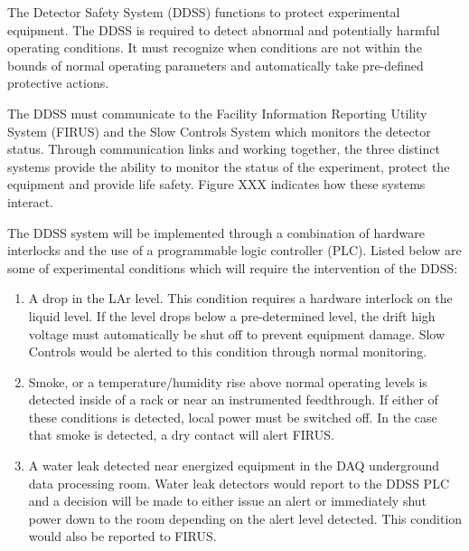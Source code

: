 The  Detector Safety System (DDSS) functions to protect
experimental equipment.  The DDSS is required to detect abnormal and
potentially harmful operating conditions.  It must recognize when
conditions are not within the bounds of normal operating parameters
and automatically take pre-defined protective actions.

The DDSS must communicate to the Facility Information Reporting Utility
System (FIRUS) and the Slow Controls System which monitors the
detector status.  Through communication links and working together,
the three distinct systems provide the ability to monitor the status
of the experiment, protect the equipment and provide life
safety. Figure XXX indicates how these systems interact.

The DDSS system will be implemented through a combination of hardware
interlocks and the use of a programmable logic controller (PLC).
Listed below are some of  experimental conditions which will
require the intervention of the DDSS:
\begin{enumerate}
 \item A drop in the LAr level.  This condition requires a hardware
   interlock on the liquid level.  If the level drops below a
   pre-determined level, the drift high voltage must automatically be
   shut off to prevent equipment damage.  Slow Controls would be
   alerted to this condition through normal monitoring.
 \item Smoke, or a temperature/humidity rise above normal operating
   levels is detected inside of a rack or near an instrumented
   feedthrough.  If either of these conditions is detected, local
   power must be switched off. In the case that smoke is detected, a
   dry contact will alert FIRUS.
 \item A water leak detected near energized equipment in the DAQ
   underground data processing room.  Water leak detectors would
   report to the DDSS PLC and a decision will be made to either
   issue an alert or immediately shut power down to the room depending
   on the alert level detected.  This condition would also be reported
   to FIRUS.
\end{enumerate}


